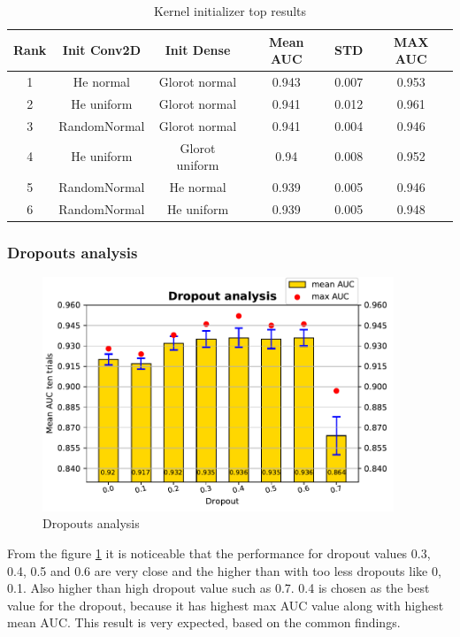 \begin{center}
  \begin{table}
    \begin{tabular}{||c c c c c c||} 
      \hline\hline
      Rank & Init Conv2D & Init Dense & Mean AUC & STD & MAX AUC\\ [0.5ex] 
      \hline
      1 & He normal & Glorot normal & 0.943 & 0.007 & 0.953 \\ 
      \hline
      2 & He uniform & Glorot normal & 0.941 & 0.012 & 0.961 \\
      \hline
      3 & RandomNormal & Glorot normal & 0.941 & 0.004 & 0.946 \\
      \hline
      4 & He uniform & Glorot uniform & 0.94 & 0.008 & 0.952\\
      \hline
      5 & RandomNormal & He normal & 0.939 & 0.005 & 0.946\\
      \hline
      6 & RandomNormal & He uniform & 0.939 & 0.005 & 0.948\\
      \hline
    \end{tabular}
  \caption{Kernel initializer top results}
  \label{table:kernel_init}
\end{table} 
\end{center}

\flushbottom
\newpage

\subsubsection{Dropouts analysis}


\begin{figure}[ht]
\centering
\includegraphics[height= 7cm]{images/contrastive/contrastive_loss_dropout_bar}
\caption{Dropouts analysis}
\label{fig:contrastive_loss_dropout_bar}
\end{figure}

From the figure \ref{fig:contrastive_loss_dropout_bar} it is noticeable that the performance for dropout values 0.3, 0.4, 0.5 and 0.6 are very close and the higher than with too less dropouts like 0, 0.1. Also higher
than high dropout value such as 0.7. 0.4 is chosen as the best value for the dropout, because it has highest max AUC value along with highest mean AUC. This result is very expected, based on the common findings.

